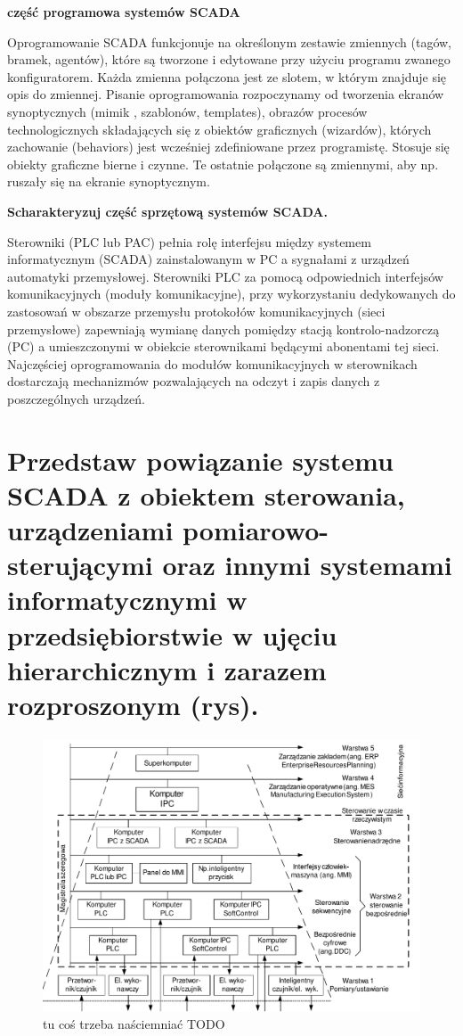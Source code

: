 \documentclass{article}
\begin{document}
	
\textbf{	część programowa systemów SCADA}


	Oprogramowanie SCADA funkcjonuje na określonym zestawie zmiennych (tagów, bramek, agentów), które są tworzone i edytowane przy użyciu programu zwanego konfiguratorem. Każda zmienna połączona jest ze slotem, w którym znajduje się opis do zmiennej. Pisanie oprogramowania rozpoczynamy od tworzenia ekranów synoptycznych (mimik , szablonów, templates), obrazów procesów technologicznych składających się z obiektów graficznych (wizardów), których zachowanie (behaviors) jest wcześniej zdefiniowane przez programistę. Stosuje się obiekty graficzne bierne i czynne. Te ostatnie połączone są zmiennymi, aby np. ruszały się na ekranie synoptycznym.
	
	\textbf{ Scharakteryzuj część sprzętową systemów SCADA. }
	
	Sterowniki (PLC lub PAC) pełnia rolę interfejsu między systemem informatycznym (SCADA) zainstalowanym w PC a sygnałami z urządzeń automatyki przemysłowej. Sterowniki PLC za pomocą odpowiednich interfejsów komunikacyjnych (moduły komunikacyjne), przy wykorzystaniu dedykowanych do zastosowań w obszarze przemysłu protokołów komunikacyjnych (sieci przemysłowe) zapewniają wymianę danych pomiędzy stacją kontrolo-nadzorczą (PC) a umieszczonymi w obiekcie sterownikami będącymi abonentami tej sieci. Najczęściej oprogramowania do modułów komunikacyjnych w sterownikach dostarczają mechanizmów pozwalających na odczyt i zapis danych z poszczególnych urządzeń. 
	\section{Przedstaw powiązanie systemu SCADA z obiektem sterowania, urządzeniami pomiarowo-sterującymi oraz innymi systemami informatycznymi w przedsiębiorstwie w ujęciu hierarchicznym i zarazem rozproszonym (rys).}
	\begin{figure}[!htb]
		\centering
		\includegraphics[width=1\linewidth]{schemat-obiekt-scada}
		\caption{tu coś trzeba naściemniać TODO}
		\label{fig:schemat-obiekt-scada}
	\end{figure}
\end{document}
